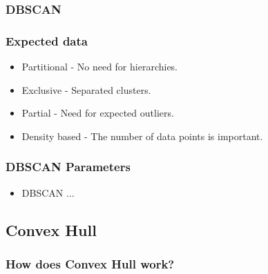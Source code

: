 \subsubsection{DBSCAN} %
\begin{frame}
\frametitle{Expected data}
	\begin{itemize}
		\item Partitional - No need for hierarchies.
		\item Exclusive - Separated clusters.
		\item Partial - Need for expected outliers.
		\item Density based - The number of data points is important.
	\end{itemize}
\end{frame}	
\begin{frame}
\frametitle{DBSCAN Parameters}
	\begin{itemize}
		\item DBSCAN ...
	\end{itemize}
\end{frame}	


\subsection{Convex Hull}
\subsubsection{How does Convex Hull work?}
